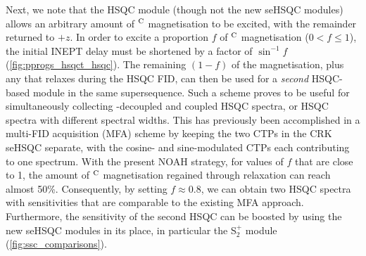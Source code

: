 \documentclass[11pt]{article}
\newcommand*{\noahSpb}{S$^+_2$}
\newcommand*{\hl}[1]{\textcolor{WildStrawberry}{#1}}
\newcommand*{\carbon}{\ce{^{13}C}}
\newcommand*{\magn}[1]{\ce{^1H}$^{#1}$}
\begin{document}
Next, we note that the HSQC module (though not the new seHSQC modules) allows an arbitrary amount of \magn{\ce{C}} magnetisation to be excited, with the remainder returned to $+z$.
In order to excite a proportion $f$ of \magn{\ce{C}} magnetisation ($0 < f \leq 1$), the initial INEPT delay must be shortened by a factor of $\sin^{-1}f$ (\cref{fig:pprogs_hsqct_hsqc}).
The remaining $(1 - f)$ of the magnetisation, plus any that relaxes during the HSQC FID, can then be used for a \textit{second} HSQC-based module in the same supersequence.
Such a scheme proves to be useful for simultaneously collecting \carbon{}-decoupled and coupled HSQC spectra, or HSQC spectra with different spectral widths.
This has previously been accomplished in a multi-FID acquisition (MFA) scheme by keeping the two CTPs in the CRK seHSQC separate, with the cosine- and sine-modulated CTPs each contributing to one spectrum.\autocite{ctphsqc}
With the present NOAH strategy, for values of $f$ that are close to 1, the amount of \magn{\ce{C}} magnetisation regained through relaxation can reach almost 50\%.
Consequently, by setting $f \approx 0.8$, we can obtain two HSQC spectra with sensitivities that are comparable to the existing MFA approach.
Furthermore, the sensitivity of the second HSQC can be boosted by using \hl{the new seHSQC modules in its place, in particular the \noahSpb{} module (\cref{fig:ssc_comparisons})}.
\end{document}
